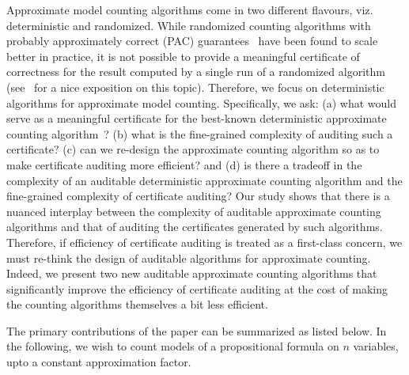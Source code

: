 Approximate model counting algorithms come in two different flavours,
viz. deterministic and randomized.  While randomized counting
algorithms with probably approximately correct (PAC)
guarantees~\cite{Valiant84,Valiant84CACM} have been found to scale
better in practice, { it is not possible to provide a meaningful
certificate of correctness for the result computed by a single run of
a randomized algorithm (see~\cite{mehlhorn-auditable} for a nice
exposition on this topic)}.  Therefore, we focus on deterministic
algorithms for approximate model counting.  Specifically, we ask: (a)
what would serve as a meaningful certificate for the best-known
deterministic approximate counting algorithm~\cite{stockmeyer}?
(b) what is the fine-grained complexity of auditing such a
certificate?  (c) can we re-design the approximate counting algorithm
so as to make certificate auditing more efficient?  and (d) is there a
tradeoff in the complexity of an auditable deterministic approximate
counting algorithm and the fine-grained complexity of certificate
auditing?  Our study shows that there is a nuanced interplay between
the complexity of auditable approximate counting algorithms and that
of auditing the certificates generated by such algorithms. Therefore,
if efficiency of certificate auditing is treated as a first-class
concern, we must re-think the design of auditable
algorithms for approximate counting.  Indeed, we present two new
auditable approximate counting algorithms that
significantly improve the efficiency of certificate auditing at the
cost of making the counting algorithms themselves a bit less
efficient.





The primary contributions of the paper can be summarized as listed
below.  In the following, we wish to count models of a propositional
formula on $n$ variables, upto a constant approximation factor.  




